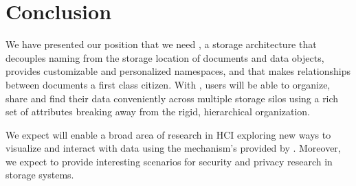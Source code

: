 \section{Conclusion}
\label{sec:conclusion}

We have presented our position that we need \system, a storage architecture that decouples naming from the storage location of documents and data objects, provides customizable and personalized namespaces, and that makes relationships between documents a first class citizen. With \system, users will be able to organize, share and find their data conveniently across multiple storage silos using a rich set of attributes breaking away from the rigid, hierarchical organization.

We expect \system will enable a broad area of research in HCI exploring new ways to visualize and interact with data using the mechanism's provided by \system. Moreover, we expect \system to provide interesting scenarios for security and privacy research in storage systems.

